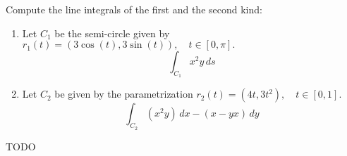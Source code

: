 \begin{exercise}
	Compute the line integrals of the first and the second kind:
	\begin{enumerate}
		\item Let $C_1$ be the semi-circle given by $ r_1(t) = (3 \cos(t), 3 \sin(t)), \quad t \in [0, \pi]. $
		      $$
			      \int_{C_1} x^2 y \, ds
		      $$
		\item Let $C_2$ be given by the parametrization $ r_2(t) = (4t, 3t^2), \quad t \in [0,1]. $
		      $$
			      \int_{C_2} (x^2 y) \, dx - (x - yx) \, dy
		      $$
	\end{enumerate}
\end{exercise}

\begin{solution}
	TODO
\end{solution}
